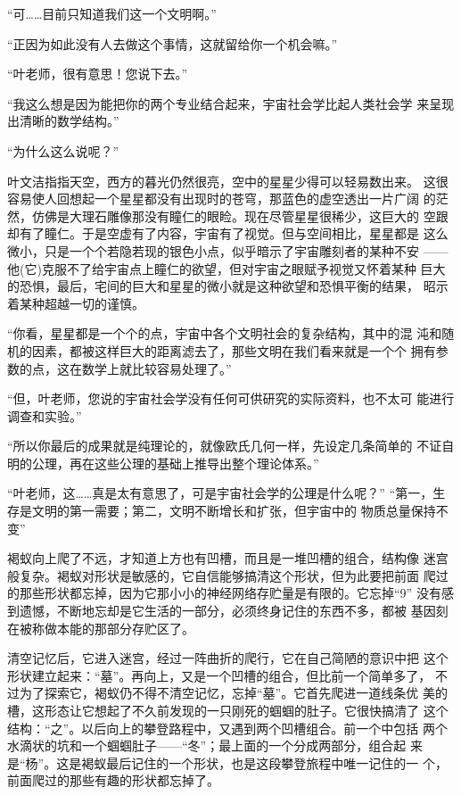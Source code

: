 “可……目前只知道我们这一个文明啊。”

“正因为如此没有人去做这个事情，这就留给你一个机会嘛。”

“叶老师，很有意思！您说下去。”

“我这么想是因为能把你的两个专业结合起来，宇宙社会学比起人类社会学
来呈现出清晰的数学结构。”

“为什么这么说呢？”

叶文洁指指天空，西方的暮光仍然很亮，空中的星星少得可以轻易数出来。
这很容易使人回想起一个星星都没有出现时的苍穹，那蓝色的虚空透出一片广阔
的茫然，仿佛是大理石雕像那没有瞳仁的眼睑。现在尽管星星很稀少，这巨大的
空跟却有了瞳仁。于是空虚有了内容，宇宙有了视觉。但与空间相比，星星都是
这么微小，只是一个个若隐若现的银色小点，似乎暗示了宇宙雕刻者的某种不安
——他(它)克服不了给宇宙点上瞳仁的欲望，但对宇宙之眼赋予视觉又怀着某种
巨大的恐惧，最后，宅间的巨大和星星的微小就是这种欲望和恐惧平衡的结果，
昭示着某种超越一切的谨慎。

“你看，星星都是一个个的点，宇宙中各个文明社会的复杂结构，其中的混
沌和随机的因素，都被这样巨大的距离滤去了，那些文明在我们看来就是一个个
拥有参数的点，这在数学上就比较容易处理了。”

“但，叶老师，您说的宇宙社会学没有任何可供研究的实际资料，也不太可
能进行调查和实验。”

“所以你最后的成果就是纯理论的，就像欧氏几何一样，先设定几条简单的
不证自明的公理，再在这些公理的基础上推导出整个理论体系。”

“叶老师，这……真是太有意思了，可是宇宙社会学的公理是什么呢？”
“第一，生存是文明的第一需要；第二，文明不断增长和扩张，但宇宙中的
物质总量保持不变”

褐蚁向上爬了不远，才知道上方也有凹槽，而且是一堆凹槽的组合，结构像
迷宫般复杂。褐蚁对形状是敏感的，它自信能够搞清这个形状，但为此要把前面
爬过的那些形状都忘掉，因为它那小小的神经网络存贮量是有限的。它忘掉“9”
没有感到遗憾，不断地忘却是它生活的一部分，必须终身记住的东西不多，都被
基因刻在被称做本能的那部分存贮区了。

清空记忆后，它进入迷宫，经过一阵曲折的爬行，它在自己简陋的意识中把
这个形状建立起来：“墓”。再向上，又是一个凹槽的组合，但比前一个简单多了，
不过为了探索它，褐蚁仍不得不清空记忆，忘掉“墓”。它首先爬进一道线条优
美的槽，这形态让它想起了不久前发现的一只刚死的蝈蝈的肚子。它很快搞清了
这个结构：“之”。以后向上的攀登路程中，又遇到两个凹槽组合。前一个中包括
两个水滴状的坑和一个蝈蝈肚子——“冬”；最上面的一个分成两部分，组合起
来是“杨”。这是褐蚁最后记住的一个形状，也是这段攀登旅程中唯一记住的一
个，前面爬过的那些有趣的形状都忘掉了。

